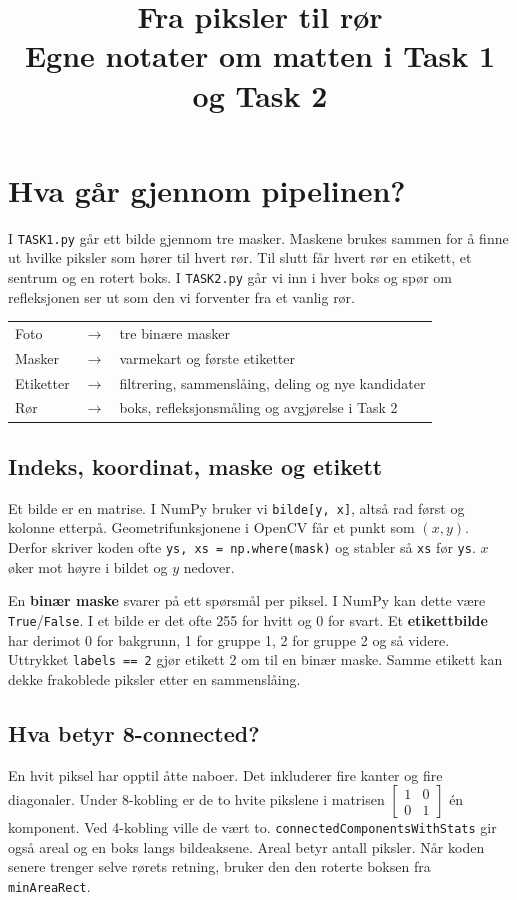 \documentclass[11pt,a4paper]{article}
\title{Fra piksler til rør\\[4pt]\large Egne notater om matten i Task 1 og Task 2}
\author{}
\date{}
\newcommand{\code}[1]{\texttt{#1}}
\begin{document}
\maketitle

\section{Hva går gjennom pipelinen?}

I \code{TASK1.py} går ett bilde gjennom tre masker. Maskene brukes sammen for å finne ut hvilke piksler som hører til hvert rør. Til slutt får hvert rør en etikett, et sentrum og en rotert boks. I \code{TASK2.py} går vi inn i hver boks og spør om refleksjonen ser ut som den vi forventer fra et vanlig rør.

\begin{center}
\begin{tabular}{@{}lcl@{}}
Foto & $\longrightarrow$ & tre binære masker \\
Masker & $\longrightarrow$ & varmekart og første etiketter \\
Etiketter & $\longrightarrow$ & filtrering, sammenslåing, deling og nye kandidater \\
Rør & $\longrightarrow$ & boks, refleksjonsmåling og avgjørelse i Task 2
\end{tabular}
\end{center}

\subsection*{Indeks, koordinat, maske og etikett}
Et bilde er en matrise. I NumPy bruker vi \code{bilde[y, x]}, altså rad først og kolonne etterpå. Geometrifunksjonene i OpenCV får et punkt som $(x,y)$. Derfor skriver koden ofte \code{ys, xs = np.where(mask)} og stabler så \code{xs} før \code{ys}. $x$ øker mot høyre i bildet og $y$ nedover.

En \textbf{binær maske} svarer på ett spørsmål per piksel. I NumPy kan dette være \code{True}/\code{False}. I et bilde er det ofte 255 for hvitt og 0 for svart. Et \textbf{etikettbilde} har derimot 0 for bakgrunn, 1 for gruppe 1, 2 for gruppe 2 og så videre. Uttrykket \code{labels == 2} gjør etikett 2 om til en binær maske. Samme etikett kan dekke frakoblede piksler etter en sammenslåing.

\subsection*{Hva betyr 8-connected?}
En hvit piksel har opptil åtte naboer. Det inkluderer fire kanter og fire diagonaler. Under 8-kobling er de to hvite pikslene i matrisen
$\left[\begin{smallmatrix}1&0\\0&1\end{smallmatrix}\right]$
én komponent. Ved 4-kobling ville de vært to. \code{connectedComponentsWithStats} gir også areal og en boks langs bildeaksene. Areal betyr antall piksler. Når koden senere trenger selve rørets retning, bruker den den roterte boksen fra \code{minAreaRect}.
\end{document}
